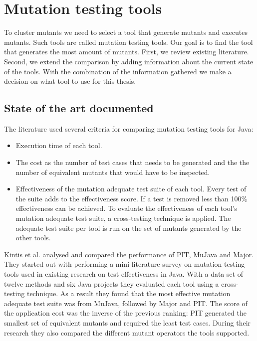 \documentclass[../main]{subfiles}
\begin{document}
\chapter{Mutation testing tools}
\label{ch:mutation-tool}
To cluster mutants we need to select a tool that generate mutants and executes mutants.
Such tools are called mutation testing tools.
Our goal is to find the tool that generates the most amount of mutants. 
\newline
First, we review existing literature. 
Second, we extend the comparison by adding information about the current state of the tools.
With the combination of the information gathered we make a decision on what tool to use for this thesis.

\section{State of the art documented}
\label{ch:tooling-literature}
The literature used several criteria for comparing mutation testing tools for Java:
\begin{itemize}
  \item Execution time of each tool.
  \item The cost as the number of test cases that needs to be generated and the the number of equivalent mutants that would have to be inspected.
  \item Effectiveness of the mutation adequate test suite of each tool. Every test of the suite adds to the effectiveness score. If a test is removed less than 100\% effectiveness can be achieved. To evaluate the effectiveness of each tool's mutation adequate test suite, a cross-testing technique is applied. The adequate test suite per tool is run on the set of mutants generated by the other tools.
\end{itemize}
Kintis et al. analysed and compared the performance of PIT,  MuJava and Major\cite{Kintis2016AnalysingStudy}. 
They started out with performing a mini literature survey on mutation testing tools used in existing research on test effectiveness in Java. 
With a data set of twelve methods and six Java projects they evaluated each tool using a cross-testing technique.
As a result they found that the most effective mutation adequate test suite was from MuJava, followed by Major and PIT.
The score of the application cost was the inverse of the previous ranking: PIT generated the smallest set of equivalent mutants and required the least test cases.
During their research they also compared the different mutant operators the tools supported. 
\end{document}

